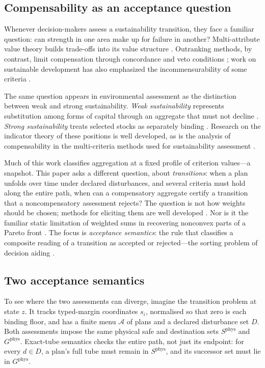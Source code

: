 \documentclass[preprint,11pt,authoryear]{elsarticle}
\theoremstyle{definition}
\theoremstyle{remark}
\begin{document}
\subsection{Compensability as an acceptance question}

Whenever decision-makers assess a sustainability transition, they face a familiar question: can strength in one area make up for failure in another? Multi-attribute value theory builds trade-offs into its value structure \citep{KeeneyRaiffa1976}. Outranking methods, by contrast, limit compensation through concordance and veto conditions \citep{Roy1996,Vincke1992}; work on sustainable development has also emphasized the incommensurability of some criteria \citep{Munda2005,MartinezAlier1998}.

The same question appears in environmental assessment as the distinction between weak and strong sustainability. \emph{Weak sustainability} represents substitution among forms of capital through an aggregate that must not decline \citep{WorldBank2011,Neumayer2013,Boos2015}. \emph{Strong sustainability} treats selected stocks as separately binding \citep{Daly1990,Ekins2003}. Research on the indicator theory of these positions is well developed, as is the analysis of compensability in the multi-criteria methods used for sustainability assessment \citep{Hanley1999,Martinet2011,CairnsMartinet2014,DoyenGajardo2020,Usubiaga2025,Cinelli2014,Schar2025}.

Much of this work classifies aggregation at a fixed profile of criterion values—a snapshot. This paper asks a different question, about \emph{transitions}: when a plan unfolds over time under declared disturbances, and several criteria must hold along the entire path, when can a compensatory aggregate certify a transition that a noncompensatory assessment rejects? The question is not how weights should be chosen; methods for eliciting them are well developed \citep{Nardo2008,Becker2017}. Nor is it the familiar static limitation of weighted sums in recovering nonconvex parts of a Pareto front \citep{DasDennis1997}. The focus is \emph{acceptance semantics}: the rule that classifies a composite reading of a transition as accepted or rejected—the sorting problem of decision aiding \citep{Roy1996}.

\subsection{Two acceptance semantics}

To see where the two assessments can diverge, imagine the transition problem at state $z$. It tracks typed-margin coordinates $s_i$, normalised so that zero is each binding floor, and has a finite menu $\mathcal A$ of plans and a declared disturbance set $D$. Both assessments impose the same physical safe and destination sets $S^{\mathrm{phys}}$ and $G^{\mathrm{phys}}$. Exact-tube semantics checks the entire path, not just its endpoint: for every $d\in D$, a plan's full tube must remain in $S^{\mathrm{phys}}$, and its successor set must lie in $G^{\mathrm{phys}}$.
\end{document}
